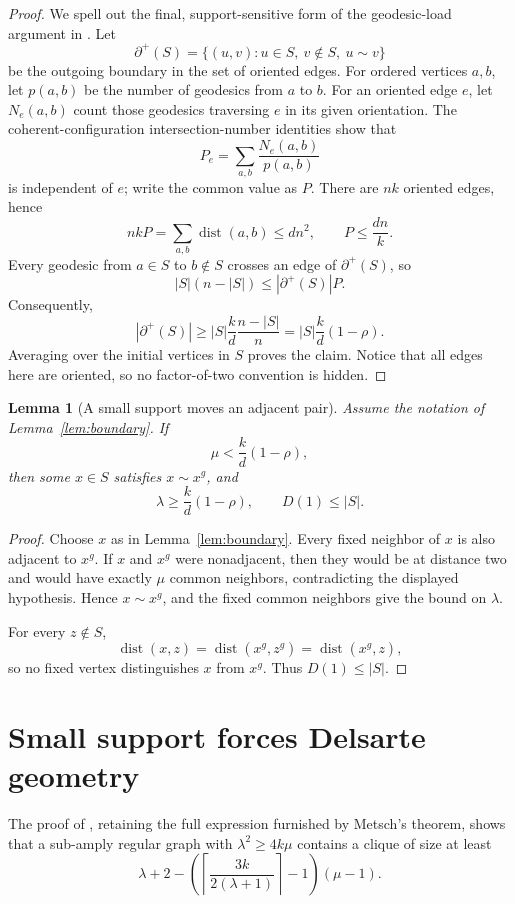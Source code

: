 \documentclass[11pt]{amsart}
\newtheorem{lemma}[theorem]{Lemma}
\theoremstyle{definition}
\newcommand{\dist}{\operatorname{dist}}
\begin{document}
\begin{proof}
We spell out the final, support-sensitive form of the geodesic-load argument in \cite[Proposition~2.8]{PS}.  Let
\[
 \partial^+(S)=\{(u,v):u\in S,\ v\notin S,\ u\sim v\}
\]
be the outgoing boundary in the set of oriented edges.  For ordered vertices $a,b$, let $p(a,b)$ be the number of geodesics from $a$ to $b$.  For an oriented edge $e$, let $N_e(a,b)$ count those geodesics traversing $e$ in its given orientation.  The coherent-configuration intersection-number identities show that
\[
 P_e=\sum_{a,b}\frac{N_e(a,b)}{p(a,b)}
\]
is independent of $e$; write the common value as $P$.  There are $nk$ oriented edges, hence
\[
 nkP=\sum_{a,b}\dist(a,b)\le dn^2,
 \qquad P\le\frac{dn}{k}.
\]
Every geodesic from $a\in S$ to $b\notin S$ crosses an edge of $\partial^+(S)$, so
\[
 |S|(n-|S|)\le |\partial^+(S)|P.
\]
Consequently,
\[
 |\partial^+(S)|\ge |S|\frac{k}{d}\frac{n-|S|}{n}
 =|S|\frac{k}{d}(1-\rho).
\]
Averaging over the initial vertices in $S$ proves the claim.  Notice that all edges here are oriented, so no factor-of-two convention is hidden.
\end{proof}

\begin{lemma}[A small support moves an adjacent pair]\label{lem:adjacent}
Assume the notation of Lemma~\ref{lem:boundary}.  If
\[
 \mu<\frac{k}{d}(1-\rho),
\]
then some $x\in S$ satisfies $x\sim x^g$, and
\begin{equation}\label{eq:supportdata}
 \lambda\ge\frac{k}{d}(1-\rho),
 \qquad
 D(1)\le |S|.
\end{equation}
\end{lemma}

\begin{proof}
Choose $x$ as in Lemma~\ref{lem:boundary}.  Every fixed neighbor of $x$ is also adjacent to $x^g$.  If $x$ and $x^g$ were nonadjacent, then they would be at distance two and would have exactly $\mu$ common neighbors, contradicting the displayed hypothesis.  Hence $x\sim x^g$, and the fixed common neighbors give the bound on $\lambda$.

For every $z\notin S$,
\[
 \dist(x,z)=\dist(x^g,z^g)=\dist(x^g,z),
\]
so no fixed vertex distinguishes $x$ from $x^g$.  Thus $D(1)\le|S|$.
\end{proof}

\section{Small support forces Delsarte geometry}
The proof of \cite[Proposition~2.6]{PS}, retaining the full expression furnished by Metsch's theorem, shows that a sub-amply regular graph with $\lambda^2\ge4k\mu$ contains a clique of size at least
\begin{equation}\label{eq:metsch}
 \lambda+2-
 \left(\left\lceil\frac{3k}{2(\lambda+1)}\right\rceil-1\right)(\mu-1).
\end{equation}
\end{document}
